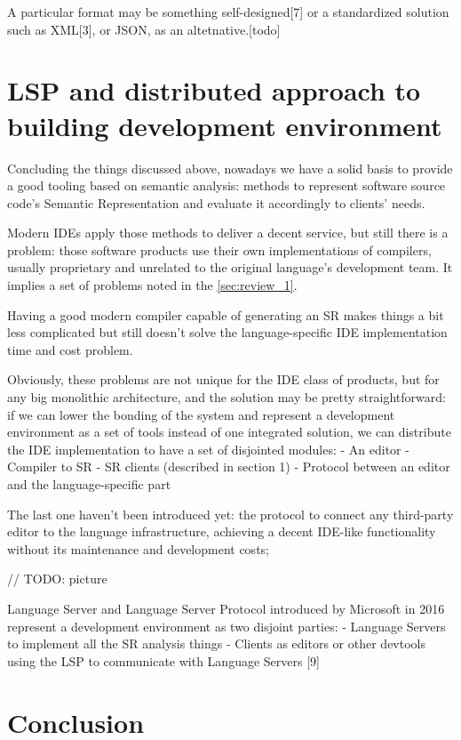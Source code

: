 A particular format may be something self-designed[7] or a standardized
solution such as XML[3], or JSON, as an altetnative.[todo]

\section{LSP and distributed approach to building development
environment}
\label{sec:review_3}

Concluding the things discussed above, nowadays we have a solid basis to
provide a good tooling based on semantic analysis: methods to represent
software source code’s Semantic Representation and evaluate it accordingly to
clients’ needs.

Modern IDEs apply those methods to deliver a decent service, but still there is a
problem: those software products use their own implementations of compilers,
usually proprietary and unrelated to the original language’s development team.
It implies a set of problems noted in the \ref{sec:review_1}.

Having a good modern compiler capable of generating an SR makes things a bit
less complicated but still doesn’t solve the language-specific IDE
implementation time and cost problem.

Obviously, these problems are not unique for the IDE class of products, but for
any big monolithic architecture, and the solution may be pretty straightforward:
if we can lower the bonding of the system and represent a development
environment as a set of tools instead of one integrated solution, we can
distribute the IDE implementation to have a set of disjointed modules:
- An editor
- Compiler to SR
- SR clients (described in section 1)
- Protocol between an editor and the language-specific part

The last one haven’t been introduced yet: the protocol to connect any
third-party editor to the language infrastructure, achieving a decent IDE-like
functionality without its maintenance and development costs;

// TODO: picture

Language Server and Language Server Protocol introduced by Microsoft in 2016
represent a development environment as two disjoint parties:
- Language Servers to implement all the SR analysis things
- Clients as editors or other devtools using the LSP to communicate with
Language Servers [9]

\section{Conclusion}
\label{sec:review_conclusion}

